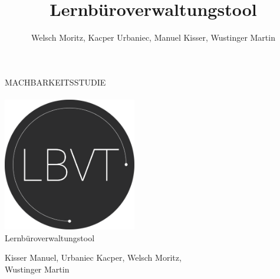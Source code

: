 \documentclass[minted, notitle]{protocol}
\title{Lernbüroverwaltungstool}
\author{Welsch Moritz, Kacper Urbaniec, Manuel Kisser, Wustinger Martin}
\begin{document}
\begin{titlepage} %
	\raggedleft %
	
	\begingroup \color{gray}{\rule{3pt}{\textheight}} \endgroup %
	\hspace{0.05\textwidth} %
	\parbox[b]{0.75\textwidth}{ %
		{{\fontsize{24}{48} \selectfont  MACHBARKEITSSTUDIE}} \\	\vspace{0.284\textheight} \\
		
		{\includegraphics[width=220]{images/Logo_1.png}} \\[2\baselineskip]
		{{\fontsize{20}{48} \selectfont Lernbüroverwaltungstool}} \\ %
		{\vspace{-0.5cm}\large \begin{flushleft}Kisser Manuel, Urbaniec Kacper, Welsch Moritz, \\Wustinger Martin\end{flushleft}}\\ [1\baselineskip] %
		
}
\end{titlepage}
\end{document}
